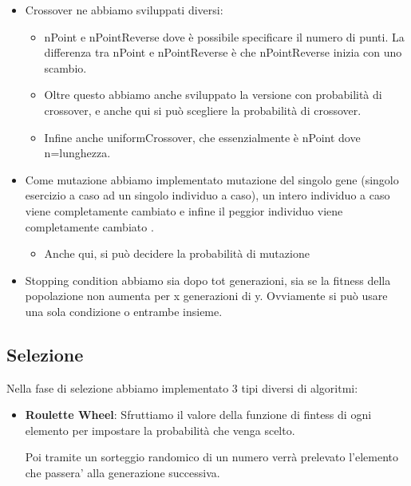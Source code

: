 \documentclass{article}
\begin{document}
\begin{itemize}
\item Crossover ne abbiamo sviluppati diversi:

\begin{itemize}

\item nPoint e nPointReverse dove è possibile specificare il numero di punti. La differenza tra nPoint e nPointReverse è che nPointReverse inizia con uno scambio.

\item Oltre questo abbiamo anche sviluppato la versione con probabilità di crossover, e anche qui si può scegliere la probabilità di crossover.

\item Infine anche uniformCrossover, che essenzialmente è nPoint dove n=lunghezza.

\end{itemize}

\item Come mutazione abbiamo implementato mutazione del singolo gene (singolo esercizio a caso ad un singolo individuo a caso), un intero individuo a caso viene completamente cambiato e infine il peggior individuo viene completamente cambiato .

\begin{itemize}
\item Anche qui, si può decidere la probabilità di mutazione
\end{itemize}

\item Stopping condition abbiamo sia dopo tot generazioni, sia se la fitness della popolazione non aumenta per x generazioni di y.
Ovviamente si può usare una sola condizione o entrambe insieme.
\end{itemize}

\bigskip

\subsection{Selezione}

Nella fase di selezione abbiamo implementato 3 tipi diversi di algoritmi:

\begin{itemize}
\item\textbf{Roulette Wheel}: Sfruttiamo il valore della funzione di fintess di ogni elemento per impostare la probabilità che venga scelto.

Poi tramite un sorteggio randomico di un numero verrà prelevato l'elemento che passera' alla generazione successiva.
\end{itemize}
\end{document}
